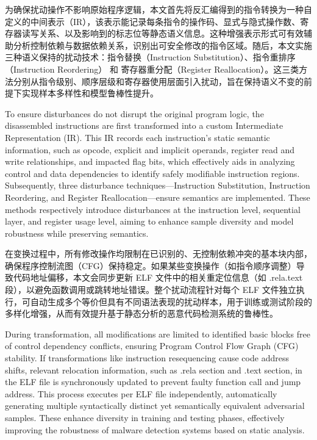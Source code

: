 为确保扰动操作不影响原始程序逻辑，本文首先将反汇编得到的指令转换为一种自定义的中间表示（IR），该表示能记录每条指令的操作码、显式与隐式操作数、寄存器读写关系、以及影响到的标志位等静态语义信息。这种增强表示形式可有效辅助分析控制依赖与数据依赖关系，识别出可安全修改的指令区域。随后，本文实施三种语义保持的扰动技术：指令替换（Instruction Substitution）、指令重排序（Instruction Reordering） 和 寄存器重分配（Register Reallocation）。这三类方法分别从指令级别、顺序层级和寄存器使用层面引入扰动，旨在保持语义不变的前提下实现样本多样性和模型鲁棒性提升。

To ensure disturbances do not disrupt the original program logic, the disassembled instructions are first transformed into a custom Intermediate Representation (IR). This IR records each instruction's static semantic information, such as opcode, explicit and implicit operands, register read and write relationships, and impacted flag bits, which effectively aids in analyzing control and data dependencies to identify safely modifiable instruction regions. Subsequently, three disturbance techniques—Instruction Substitution, Instruction Reordering, and Register Reallocation—ensure semantics are implemented. These methods respectively introduce disturbances at the instruction level, sequential layer, and register usage level, aiming to enhance sample diversity and model robustness while preserving semantics.

在变换过程中，所有修改操作均限制在已识别的、无控制依赖冲突的基本块内部，确保程序控制流图（CFG）保持稳定。如果某些变换操作（如指令顺序调整）导致代码地址偏移，本文会同步更新 ELF 文件中的相关重定位信息（如 .rela.text 段），以避免函数调用或跳转地址错误。整个扰动流程针对每个 ELF 文件独立执行，可自动生成多个等价但具有不同语法表现的扰动样本，用于训练或测试阶段的多样化增强，从而有效提升基于静态分析的恶意代码检测系统的鲁棒性。

During transformation, all modifications are limited to identified basic blocks free of control dependency conflicts, ensuring Program Control Flow Graph (CFG) stability. If transformations like instruction resequencing cause code address shifts, relevant relocation information, such as .rela section and .text section, in the ELF file is synchronously updated to prevent faulty function call and jump address. This process executes per ELF file independently, automatically generating multiple syntactically distinct yet semantically equivalent adversarial samples. These enhance diversity in training and testing phases, effectively improving the robustness of malware detection systems based on static analysis.

